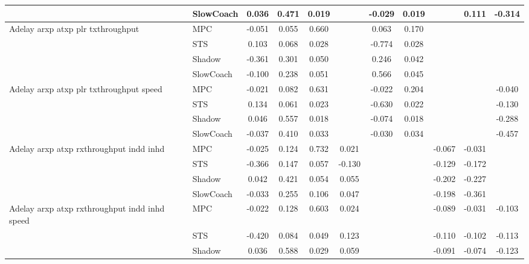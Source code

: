 \begin{tabular}{|l|l|*{9}{c|}}
                              & SlowCoach &    0.036 &     0.471 &     0.019 &     & -0.029 &  0.019 &      &   0.111 &   -0.314 \\
\midrule
Adelay arxp atxp plr txthroughput    & MPC &   -0.051 &     0.055 &     0.660 &     &  0.063 &  0.170 &      &      &       \\
                              & STS &    0.103 &     0.068 &     0.028 &     & -0.774 &  0.028 &      &      &       \\
                              & Shadow &   -0.361 &     0.301 &     0.050 &     &  0.246 &  0.042 &      &      &       \\
                              & SlowCoach &   -0.100 &     0.238 &     0.051 &     &  0.566 &  0.045 &      &      &       \\
\midrule
Adelay arxp atxp plr txthroughput speed    & MPC &   -0.021 &     0.082 &     0.631 &     & -0.022 &  0.204 &      &      &   -0.040 \\
                              & STS &    0.134 &     0.061 &     0.023 &     & -0.630 &  0.022 &      &      &   -0.130 \\
                              & Shadow &    0.046 &     0.557 &     0.018 &     & -0.074 &  0.018 &      &      &   -0.288 \\
                              & SlowCoach &   -0.037 &     0.410 &     0.033 &     & -0.030 &  0.034 &      &      &   -0.457 \\
\midrule
Adelay arxp atxp rxthroughput indd inhd    & MPC &   -0.025 &     0.124 &     0.732 &  0.021 &     &     &  -0.067 &  -0.031 &       \\
                              & STS &   -0.366 &     0.147 &     0.057 & -0.130 &     &     &  -0.129 &  -0.172 &       \\
                              & Shadow &    0.042 &     0.421 &     0.054 &  0.055 &     &     &  -0.202 &  -0.227 &       \\
                              & SlowCoach &   -0.033 &     0.255 &     0.106 &  0.047 &     &     &  -0.198 &  -0.361 &       \\
\midrule
Adelay arxp atxp rxthroughput indd inhd speed    & MPC &   -0.022 &     0.128 &     0.603 &  0.024 &     &     &  -0.089 &  -0.031 &   -0.103 \\
                              & STS &   -0.420 &     0.084 &     0.049 &  0.123 &     &     &  -0.110 &  -0.102 &   -0.113 \\
                              & Shadow &    0.036 &     0.588 &     0.029 &  0.059 &     &     &  -0.091 &  -0.074 &   -0.123 \\

\end{tabular}
